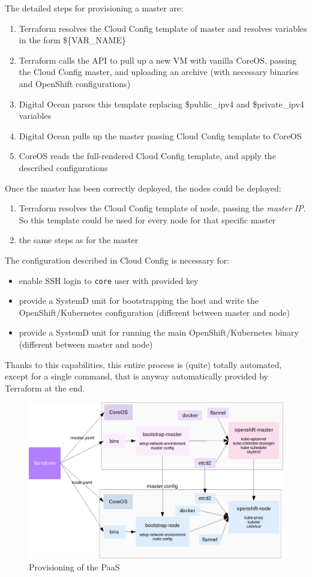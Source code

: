 The detailed steps for provisioning a master are:
\begin{enumerate}
\item Terraform resolves the Cloud Config template of master and resolves variables in the form \$\{VAR\_NAME\}
\item Terraform calls the API to pull up a new VM with vanilla CoreOS, passing the Cloud Config master, and uploading an archive (with necessary binaries and OpenShift configurations)
\item Digital Ocean parses this template replacing \$public\_ipv4 and \$private\_ipv4 variables
\item Digital Ocean pulls up the master passing Cloud Config template to CoreOS
\item CoreOS reads the full-rendered Cloud Config template, and apply the described configurations
\end{enumerate}

Once the master has been correctly deployed, the nodes could be deployed:
\begin{enumerate}
\item Terraform resolves the Cloud Config template of node, passing the \textit{master IP}.  So this template could be used for every node for that specific master
\item the same steps as for the master
\end{enumerate}

The configuration described in Cloud Config is necessary for:
\begin{itemize}
\item enable SSH login to \texttt{core} user with provided key
\item provide a SystemD unit for bootstrapping the host and write the OpenShift/Kubernetes configuration (different between master and node)
\item provide a SystemD unit for running the main OpenShift/Kubernetes binary (different between master and node)
\end{itemize}

Thanks to this capabilities, this entire process is (quite) totally automated, except for a single command, that is anyway automatically provided by Terraform at the end.

\begin{figure}[htbp]
\centering
\includegraphics{media/ch4-bootstrap.png}
\caption{Provisioning of the PaaS}
\end{figure}